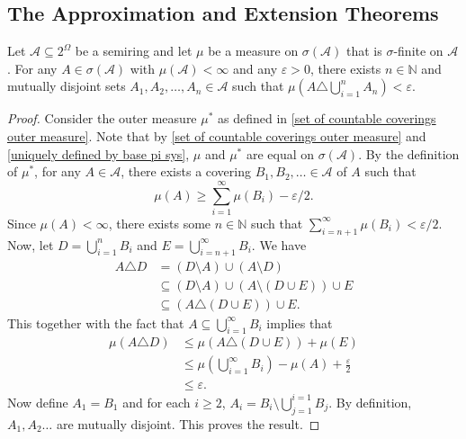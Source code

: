 \subsection{The Approximation and Extension Theorems}

\begin{theorem}
\label{Approximation Thm for Measures}
    Let $\mathcal{A}\subseteq 2^\Omega$ be a semiring and let $\mu$ be a measure on $\sigma(\mathcal{A})$ that is $\sigma$-finite on $\mathcal{A}$.
    For any $A\in\sigma(\mathcal{A})$ with $\mu(\mathcal{A})<\infty$ and any $\varepsilon>0$, there exists $n\in\mathbb{N}$ and mutually disjoint sets $A_1,A_2,\ldots,A_n\in \mathcal{A}$ such that $\mu\left(A\triangle\bigcup_{i=1}^n A_n\right)<\varepsilon$.
\end{theorem}
\begin{proof}
    Consider the outer measure $\mu^*$ as defined in \cref{set of countable coverings outer measure}. Note that by \cref{set of countable coverings outer measure} and \cref{uniquely defined by base pi sys}, $\mu$ and $\mu^*$ are equal on $\sigma(\mathcal{A})$. By the definition of $\mu^*$, for any $A\in\mathcal{A}$, there exists a covering $B_1,B_2,\ldots\in\mathcal{A}$ of $A$ such that
    $$\mu(A)\geq\sum_{i=1}^\infty\mu(B_i) - \varepsilon/2.$$
    Since $\mu(A)<\infty$, there exists some $n\in\mathbb{N}$ such that $\sum_{i=n+1}^\infty \mu(B_i) < \varepsilon/2$. Now, let $D=\bigcup_{i=1}^n B_i$ and $E=\bigcup_{i=n+1}^\infty B_i$. We have
    \begin{align*}
        A\triangle D &= (D\setminus A)\cup(A\setminus D) \\
        &\subseteq (D\setminus A)\cup (A\setminus (D\cup E))\cup E \\
        &\subseteq (A\triangle (D\cup E))\cup E.
    \end{align*}
    This together with the fact that $A\subseteq\bigcup_{i=1}^\infty B_i$ implies that
    \begin{align*}
        \mu(A\triangle D) &\leq \mu(A\triangle (D\cup E)) + \mu(E) \\
        &\leq  \mu\left(\bigcup_{i=1}^\infty B_i\right) - \mu(A) + \frac{\varepsilon}{2} \\
        &\leq \varepsilon.
    \end{align*}
    Now define $A_1=B_1$ and for each $i\geq 2$, $A_i = B_i\setminus \bigcup_{j=1}^{i=1} B_j$. By definition, $A_1,A_2\ldots$ are mutually disjoint. This proves the result.
    
\end{proof}

